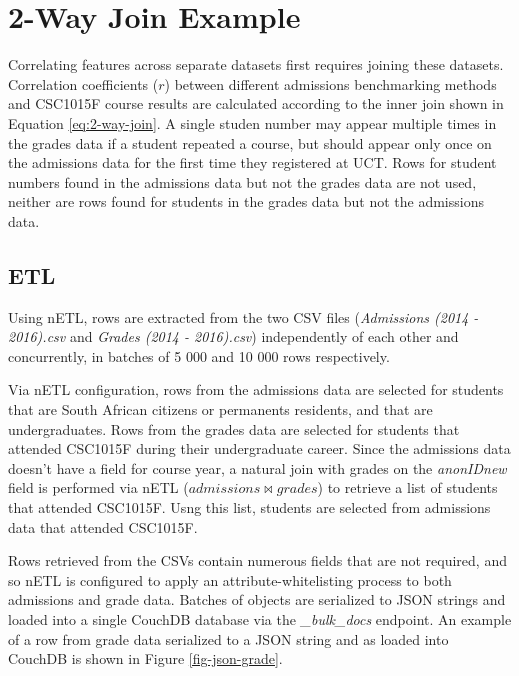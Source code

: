 \section{2-Way Join Example}
Correlating features across separate datasets first requires joining these datasets. Correlation coefficients ($r$) between different admissions benchmarking methods and CSC1015F course results are calculated according to the inner join shown in Equation \ref{eq:2-way-join}. A single studen number may appear multiple times in the grades data if a student repeated a course, but should appear only once on the admissions data for the first time they registered at UCT. Rows for student numbers found in the admissions data but not the grades data are not used, neither are rows found for students in the grades data but not the admissions data.

\subsection{ETL}
Using nETL, rows are extracted from the two CSV files (\textit{Admissions (2014 - 2016).csv} and \textit{Grades (2014 - 2016).csv}) independently of each other and concurrently, in batches of 5 000 and 10 000 rows respectively.

Via nETL configuration, rows from the admissions data are selected for students that are South African citizens or permanents residents, and that are undergraduates. Rows from the grades data are selected for students that attended CSC1015F during their undergraduate career. Since the admissions data doesn't have a field for course year, a natural join with grades on the \textit{anonIDnew} field is performed via nETL ($admissions \bowtie grades$) to retrieve a list of students that attended CSC1015F. Usng this list, students are selected from admissions data that attended CSC1015F.

Rows retrieved from the CSVs contain numerous fields that are not required, and so nETL is configured to apply an attribute-whitelisting process to both admissions and grade data. Batches of objects are serialized to JSON strings and loaded into a single CouchDB database via the \textit{\_bulk\_docs} endpoint. An example of a row from grade data serialized to a JSON string and as loaded into CouchDB is shown in Figure \ref{fig-json-grade}.



